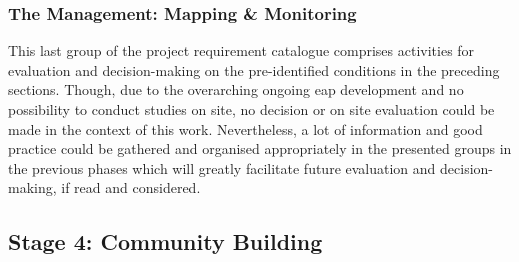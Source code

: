 \subsubsection{The Management: Mapping \& Monitoring}

This last group of the project requirement catalogue comprises activities for evaluation and decision-making on the pre-identified conditions in the preceding sections. Though, due to the overarching ongoing \acrshort{eap} development and no possibility to conduct studies on site, no decision or on site evaluation could be made in the context of this work. Nevertheless, a lot of information and good practice could be gathered and organised appropriately in the presented groups in the previous phases which will greatly facilitate future evaluation and decision-making, if read and considered. %


\subsection{Stage 4: Community Building}\label{subsec:stage4_appl} %

